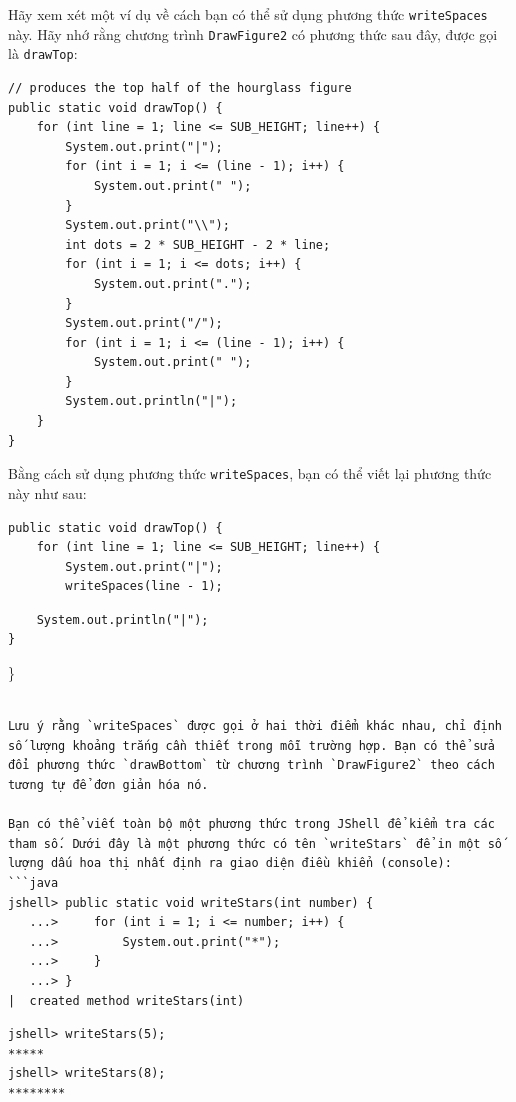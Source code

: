 Hãy xem xét một ví dụ về cách bạn có thể sử dụng phương thức
\texttt{writeSpaces} này. Hãy nhớ rằng chương trình \texttt{DrawFigure2}
có phương thức sau đây, được gọi là \texttt{drawTop}:

\begin{verbatim}
// produces the top half of the hourglass figure
public static void drawTop() {
    for (int line = 1; line <= SUB_HEIGHT; line++) {
        System.out.print("|");
        for (int i = 1; i <= (line - 1); i++) {
            System.out.print(" ");
        }
        System.out.print("\\");
        int dots = 2 * SUB_HEIGHT - 2 * line;
        for (int i = 1; i <= dots; i++) {
            System.out.print(".");
        }
        System.out.print("/");
        for (int i = 1; i <= (line - 1); i++) {
            System.out.print(" ");
        }
        System.out.println("|");
    }
}
\end{verbatim}

Bằng cách sử dụng phương thức \texttt{writeSpaces}, bạn có thể viết lại
phương thức này như sau:

\begin{verbatim}
public static void drawTop() {
    for (int line = 1; line <= SUB_HEIGHT; line++) {
        System.out.print("|");
        writeSpaces(line - 1);
\end{verbatim}

\begin{verbatim}
    System.out.println("|");
}
\end{verbatim}

\}

\begin{verbatim}

Lưu ý rằng `writeSpaces` được gọi ở hai thời điểm khác nhau, chỉ định số lượng khoảng trắng cần thiết trong mỗi trường hợp. Bạn có thể sửa đổi phương thức `drawBottom` từ chương trình `DrawFigure2` theo cách tương tự để đơn giản hóa nó.

Bạn có thể viết toàn bộ một phương thức trong JShell để kiểm tra các tham số. Dưới đây là một phương thức có tên `writeStars` để in một số lượng dấu hoa thị nhất định ra giao diện điều khiển (console):
```java
jshell> public static void writeStars(int number) {
   ...>     for (int i = 1; i <= number; i++) {
   ...>         System.out.print("*");
   ...>     }
   ...> }
|  created method writeStars(int)
\end{verbatim}

\begin{verbatim}
jshell> writeStars(5);
*****
jshell> writeStars(8);
********
\end{verbatim}

